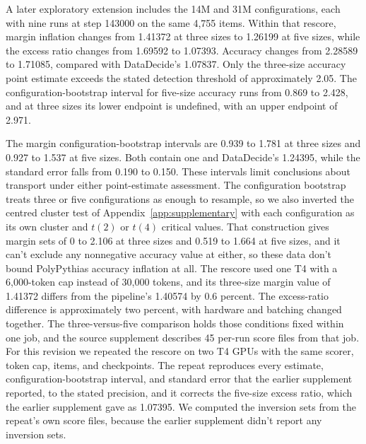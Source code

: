 A later exploratory extension includes the 14M and 31M configurations, each with nine runs at step 143000 on the same 4,755 items. Within that rescore, margin inflation changes from 1.41372 at three sizes to 1.26199 at five sizes, while the excess ratio changes from 1.69592 to 1.07393. Accuracy changes from 2.28589 to 1.71085, compared with DataDecide's 1.07837. Only the three-size accuracy point estimate exceeds the stated detection threshold of approximately 2.05. The configuration-bootstrap interval for five-size accuracy runs from 0.869 to 2.428, and at three sizes its lower endpoint is undefined, with an upper endpoint of 2.971.

The margin configuration-bootstrap intervals are 0.939 to 1.781 at three sizes and 0.927 to 1.537 at five sizes. Both contain one and DataDecide's 1.24395, while the standard error falls from 0.190 to 0.150. These intervals limit conclusions about transport under either point-estimate assessment. The configuration bootstrap treats three or five configurations as enough to resample, so we also inverted the centred cluster test of Appendix~\ref{app:supplementary} with each configuration as its own cluster and $t(2)$ or $t(4)$ critical values. That construction gives margin sets of 0 to 2.106 at three sizes and 0.519 to 1.664 at five sizes, and it can't exclude any nonnegative accuracy value at either, so these data don't bound PolyPythias accuracy inflation at all. The rescore used one T4 with a 6,000-token cap instead of 30,000 tokens, and its three-size margin value of 1.41372 differs from the pipeline's 1.40574 by 0.6 percent. The excess-ratio difference is approximately two percent, with hardware and batching changed together. The three-versus-five comparison holds those conditions fixed within one job, and the source supplement describes 45 per-run score files from that job. For this revision we repeated the rescore on two T4 GPUs with the same scorer, token cap, items, and checkpoints. The repeat reproduces every estimate, configuration-bootstrap interval, and standard error that the earlier supplement reported, to the stated precision, and it corrects the five-size excess ratio, which the earlier supplement gave as 1.07395. We computed the inversion sets from the repeat's own score files, because the earlier supplement didn't report any inversion sets.

